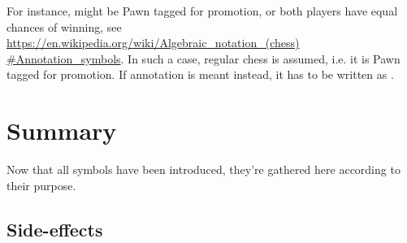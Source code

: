 For instance,  might be Pawn tagged for promotion, or both players have equal
chances of winning, see\\
\href{https://en.wikipedia.org/wiki/Algebraic\_notation\_(chess)#Annotation\_symbols}
{https://en.wikipedia.org/wiki/Algebraic\_notation\_(chess)\\
\#Annotation\_symbols}. In such a case, regular chess  is assumed, i.e. it
is Pawn tagged for promotion. If annotation is meant instead, it has to be written as
.

\clearpage %

\section*{Summary}
\label{sec:Appendix/Summary}

Now that all symbols have been introduced, they're gathered here according to their purpose.

\subsection*{Side-effects}
\label{sec:Appendix/Summary/Side-effects}

